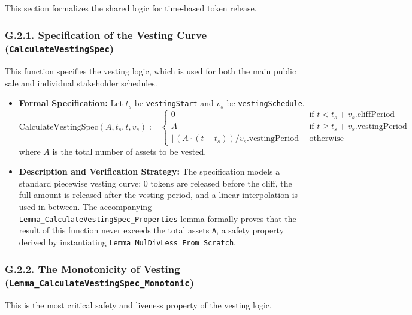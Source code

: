 \documentclass[
  english,
  onecolumn]{article}
\providecommand{\tightlist}{%
  \setlength{\itemsep}{0pt}\setlength{\parskip}{0pt}}
\begin{document}
This section formalizes the shared logic for time-based token release.

\subsubsection{\texorpdfstring{G.2.1. Specification of the Vesting Curve
(\texttt{CalculateVestingSpec})}{G.2.1. Specification of the Vesting Curve (CalculateVestingSpec)}}\label{g.2.1.-specification-of-the-vesting-curve-calculatevestingspec}

This function specifies the vesting logic, which is used for both the
main public sale and individual stakeholder schedules.

\begin{itemize}
\tightlist
\item
  \textbf{Formal Specification:} Let \(t_s\) be \texttt{vestingStart}
  and \(v_s\) be \texttt{vestingSchedule}. \[
  \text{CalculateVestingSpec}(A, t_s, t, v_s) := \begin{cases}
  0 & \text{if } t < t_s + v_s.\text{cliffPeriod} \\
  A & \text{if } t \ge t_s + v_s.\text{vestingPeriod} \\
  \lfloor (A \cdot (t - t_s)) / v_s.\text{vestingPeriod} \rfloor & \text{otherwise}
  \end{cases}
  \] where \(A\) is the total number of assets to be vested.
\item
  \textbf{Description and Verification Strategy:} The specification
  models a standard piecewise vesting curve: 0 tokens are released
  before the cliff, the full amount is released after the vesting
  period, and a linear interpolation is used in between. The
  accompanying \texttt{Lemma\_CalculateVestingSpec\_Properties} lemma
  formally proves that the result of this function never exceeds the
  total assets \texttt{A}, a safety property derived by instantiating
  \texttt{Lemma\_MulDivLess\_From\_Scratch}.
\end{itemize}

\subsubsection{\texorpdfstring{G.2.2. The Monotonicity of Vesting
(\texttt{Lemma\_CalculateVestingSpec\_Monotonic})}{G.2.2. The Monotonicity of Vesting (Lemma\_CalculateVestingSpec\_Monotonic)}}\label{g.2.2.-the-monotonicity-of-vesting-lemma_calculatevestingspec_monotonic}

This is the most critical safety and liveness property of the vesting
logic.
\end{document}

